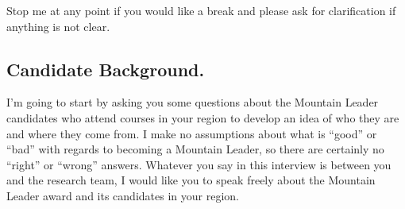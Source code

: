 \documentclass[
  12pt,
  a4paper,
]{book}
\begin{document}
Stop me at any point if you would like a break and please ask for clarification if anything is not clear.

\hypertarget{candidate-background.}{%
\subsection{Candidate Background.}\label{candidate-background.}}

I'm going to start by asking you some questions about the Mountain Leader candidates who attend courses in your region to develop an idea of who they are and where they come from. I make no assumptions about what is ``good'' or ``bad'' with regards to becoming a Mountain Leader, so there are certainly no ``right'' or ``wrong'' answers. Whatever you say in this interview is between you and the research team, I would like you to speak freely about the Mountain Leader award and its candidates in your region.
\end{document}
